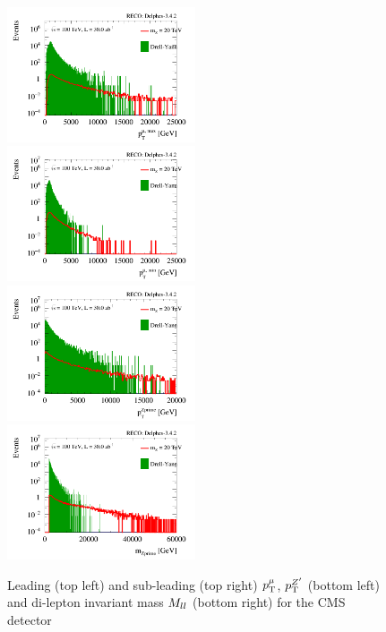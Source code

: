\documentclass{cernrep}
\begin{document}
\begin{figure}[!htb]\centering
\includegraphics[width=0.495\textwidth]{Fig/CMS_ptmu_1_sel0_nostack_log.png}
\includegraphics[width=0.495\textwidth]{Fig/CMS_ptmu_2_sel0_nostack_log.png}
\includegraphics[width=0.495\textwidth]{Fig/CMS_ptzp_sel0_nostack_log.png}
\includegraphics[width=0.495\textwidth]{Fig/CMS_mzp_sel0_nostack_log.png}
\caption{Leading (top left) and sub-leading (top right) $p_{\text{T}}^{\mu{}}$, $p_{\text{T}}^{Z^{\prime}}$ (bottom left) and 
di-lepton invariant mass $M_{ll}$ (bottom right) for the CMS  detector}
\label{fig:zpll_cms}
\end{figure}
\end{document}
